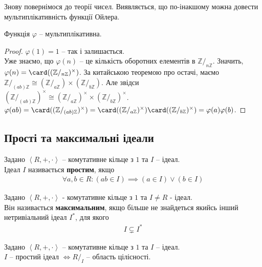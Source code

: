 \documentclass{math_library}
\begin{document}
Знову повернімося до теорії чисел. Виявляється, що по-інакшому можна довести мультиплікативність функції Ойлера.

\begin{proposition}
Функція $\varphi$ -- мультиплікативна.
\end{proposition}

\begin{proof}
$\varphi(1) = 1$ -- так і залишається.\\
Уже знаємо, що $\varphi(n)$ -- це кількість оборотних елементів в $\mathbb{Z}/_{n \mathbb{Z}}$. Значить, $\varphi(n) = \card ((\mathbb{Z}/_{n \mathbb{Z}})^\times)$. За китайською теоремою про остачі, маємо $\mathbb{Z}/_{(ab) \mathbb{Z}} \cong (\mathbb{Z}/_{a \mathbb{Z}}) \times (\mathbb{Z}/_{b \mathbb{Z}})$. Але звідси $(\mathbb{Z}/_{(ab) \mathbb{Z}})^\times \cong (\mathbb{Z}/_{a \mathbb{Z}})^\times \times (\mathbb{Z}/_{b \mathbb{Z}})^\times$.\\
$\varphi(ab) = \card((\mathbb{Z}/_{(ab)\mathbb{Z}})^\times) = \card((\mathbb{Z}/_{a \mathbb{Z}})^\times) \card((\mathbb{Z}/_{b \mathbb{Z}})^\times) = \varphi(a) \varphi(b)$.
\end{proof}

\subsection{Прості та максимальні ідеали}
\begin{definition}
Задано $\left<R,+,\cdot \right>$ -- комутативне кільце з $1$ та $I$ -- ідеал.\\
Ідеал $I$ називається \textbf{простим}, якщо
\begin{align*}
\forall a,b \in R: (ab \in I) \implies (a \in I) \vee (b \in I)
\end{align*}
\end{definition}

\begin{definition}
Задано $\left<R,+,\cdot \right>$ - комутативне кільце з $1$ та $I \neq R$ - ідеал.\\
Він називається \textbf{максимальним}, якщо більше не знайдеться якийсь інший нетривіальний ідеал $I^*$, для якого
\begin{align*}
I \subsetneq I^*
\end{align*}
\end{definition}

\begin{theorem}
Задано $\left<R,+,\cdot \right>$ -- комутативне кільце з $1$ та $I$ -- ідеал.\\
$I$ -- простий ідеал $\iff R/_I$ -- область цілісності.
\end{theorem}
\end{document}
